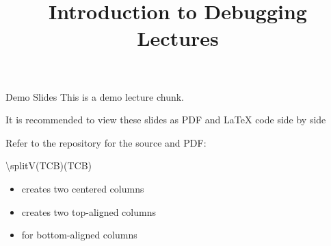 \documentclass[11pt,compress,t,notes=noshow, xcolor=table]{beamer}
\title{Introduction to Debugging Lectures}
\begin{document}

\begin{frame}[c]{Demo Slides}
  This is a demo lecture chunk.
  
  It is recommended to view these slides as PDF and LaTeX code side by side
  
  Refer to the  repository for the source and PDF:
  \begin{itemizeS}
    \item \href{https://slds-lmu.github.io/lecture_debug/lecture_debug/slides/demo/slides-demo-summary.pdf}{}
    \item \href{https://github.com/slds-lmu/lecture_debug/blob/main/slides/demo/slides-demo-summary.tex}{}
  \end{itemizeS}
  
\end{frame}

\begin{frame}{\textbackslash splitV(TCB)(TCB)}
  
  \begin{itemize}
    \item {} creates two centered columns
    \item {} creates two top-aligned columns 
    \item {} for bottom-aligned columns
  \end{itemize}
  
  \vfill
  
  
  \vfill
  
  
\end{frame}
\end{document}

